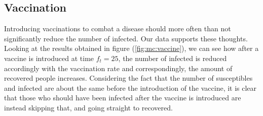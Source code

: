 \documentclass[../main.tex]{subfiles}
\begin{document}
\subsection{Vaccination}
Introducing vaccinations to combat a disease should more often than not significantly reduce the number of infected. Our data supports these thoughts. Looking at the results obtained in figure (\ref{fig:mc:vaccine}), we can see how after a vaccine is introduced at time $f_t = 25$, the number of infected is reduced accordingly with the vaccination rate and correspondingly, the amount of recovered people increases. Considering the fact that the number of susceptibles and infected are about the same before the introduction of the vaccine, it is clear that those who should have been infected after the vaccine is introduced are instead skipping that, and going straight to recovered.
\end{document}
